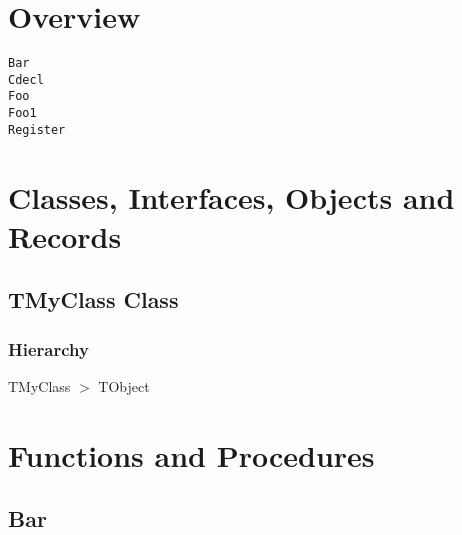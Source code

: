 \documentclass{report}
\newif\ifpdf
\begin{document}
\section{Overview}
\begin{description}
\item[\texttt{\begin{ttfamily}TMyClass\end{ttfamily} Class}]
\end{description}
\begin{description}
\item[\texttt{Bar}]
\item[\texttt{Cdecl}]
\item[\texttt{Foo}]
\item[\texttt{Foo1}]
\item[\texttt{Register}]
\end{description}
\section{Classes, Interfaces, Objects and Records}
\ifpdf
\subsection*{\large{\textbf{TMyClass Class}}\normalsize\hspace{1ex}\hrulefill}
\else
\subsection*{TMyClass Class}
\fi
\label{ok_directive_as_identifier.TMyClass}
\subsubsection*{\large{\textbf{Hierarchy}}\normalsize\hspace{1ex}\hfill}
TMyClass {$>$} TObject
\section{Functions and Procedures}
\ifpdf
\subsection*{\large{\textbf{Bar}}\normalsize\hspace{1ex}\hrulefill}
\else
\end{document}
